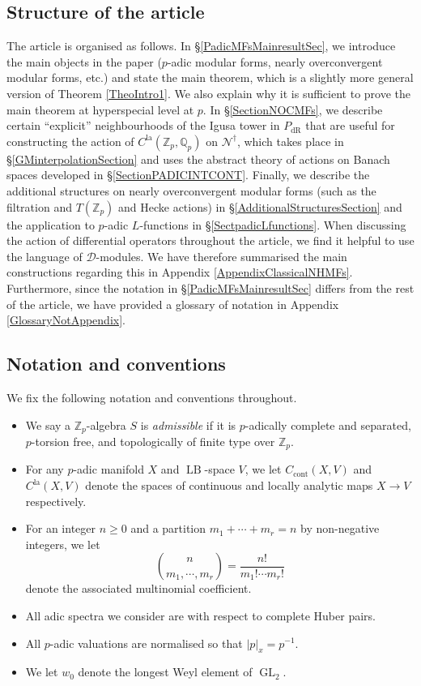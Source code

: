 \documentclass[10pt, oneside]{amsart}
\numberwithin{equation}{subsection}
\theoremstyle{definition}
\theoremstyle{remark}
\newcommand{\mbb}[1]{\mathbb{#1}}
\newcommand{\opn}[1]{\operatorname{#1}}
\begin{document}
\subsection{Structure of the article}

The article is organised as follows. In \S \ref{PadicMFsMainresultSec}, we introduce the main objects in the paper ($p$-adic modular forms, nearly overconvergent modular forms, etc.) and state the main theorem, which is a slightly more general version of Theorem \ref{TheoIntro1}. We also explain why it is sufficient to prove the main theorem at hyperspecial level at $p$. In \S \ref{SectionNOCMFs}, we describe certain ``explicit'' neighbourhoods of the Igusa tower in $P_{\opn{dR}}$ that are useful for constructing the action of $C^{\opn{la}}(\mbb{Z}_p, \mbb{Q}_p)$ on $\mathscr{N}^{\dagger}$, which takes place in \S \ref{GMinterpolationSection} and uses the abstract theory of actions on Banach spaces developed in \S \ref{SectionPADICINTCONT}. Finally, we describe the additional structures on nearly overconvergent modular forms (such as the filtration and $T(\mbb{Z}_p)$ and Hecke actions) in \S \ref{AdditionalStructuresSection} and the application to $p$-adic $L$-functions in \S \ref{SectpadicLfunctions}. When discussing the action of differential operators throughout the article, we find it helpful to use the language of $\mathcal{D}$-modules. We have therefore summarised the main constructions regarding this in Appendix \ref{AppendixClassicalNHMFs}. Furthermore, since the notation in \S \ref{PadicMFsMainresultSec} differs from the rest of the article, we have provided a glossary of notation in Appendix \ref{GlossaryNotAppendix}.

\subsection{Notation and conventions} \label{NotationAndConventionsSec}

We fix the following notation and conventions throughout.

\begin{itemize}
    \item We say a $\mbb{Z}_p$-algebra $S$ is \emph{admissible} if it is $p$-adically complete and separated, $p$-torsion free, and topologically of finite type over $\mbb{Z}_p$. 
    \item For any $p$-adic manifold $X$ and $\opn{LB}$-space $V$, we let $C_{\opn{cont}}(X, V)$ and $C^{\opn{la}}(X, V)$ denote the spaces of continuous and locally analytic maps $X \to V$ respectively.
    \item For an integer $n \geq 0$ and a partition $m_1 + \cdots + m_r = n$ by non-negative integers, we let 
    \[
    \genfrac{(}{)}{0pt}{}{n}{m_1, \cdots, m_r} = \frac{n!}{m_1! \cdots m_r!}
    \]
    denote the associated multinomial coefficient.
    \item All adic spectra we consider are with respect to complete Huber pairs.
    \item All $p$-adic valuations are normalised so that $|p|_x = p^{-1}$.
    \item We let $w_0$ denote the longest Weyl element of $\opn{GL}_2$.
\end{itemize}
\end{document}
